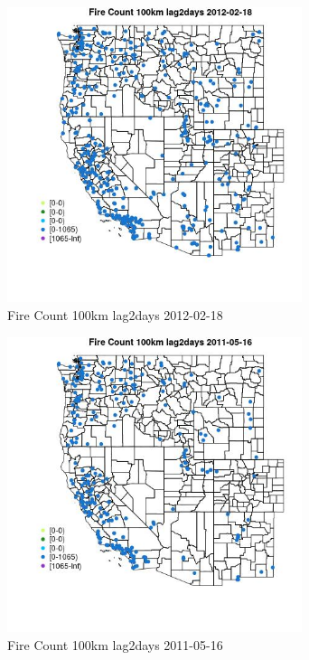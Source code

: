 \begin{figure} 
\centering  
\includegraphics[width=0.77\textwidth]{Code_Outputs/Report_ML_input_PM25_Step4_part_f_de_duplicated_aves_prioritize_24hr_obswNAs_MapObsFire_Count_100km_lag2days2012-02-18.jpg} 
\caption{\label{fig:Report_ML_input_PM25_Step4_part_f_de_duplicated_aves_prioritize_24hr_obswNAsMapObsFire_Count_100km_lag2days2012-02-18}Fire Count 100km lag2days 2012-02-18} 
\end{figure} 
 

\clearpage 

\begin{figure} 
\centering  
\includegraphics[width=0.77\textwidth]{Code_Outputs/Report_ML_input_PM25_Step4_part_f_de_duplicated_aves_prioritize_24hr_obswNAs_MapObsFire_Count_100km_lag2days2011-05-16.jpg} 
\caption{\label{fig:Report_ML_input_PM25_Step4_part_f_de_duplicated_aves_prioritize_24hr_obswNAsMapObsFire_Count_100km_lag2days2011-05-16}Fire Count 100km lag2days 2011-05-16} 
\end{figure} 
 

